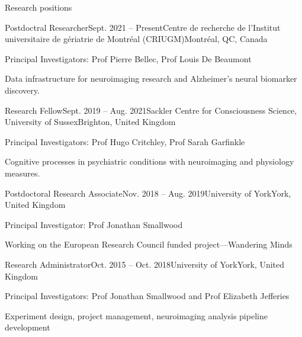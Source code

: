\documentclass{resume} %
\begin{document}
%



\begin{rSection}{Research positions}

  \begin{rSubsection}{Postdoctral Researcher}{Sept. 2021 -- Present}{Centre de recherche de l'Institut universitaire de g\'eriatrie de Montr\'eal (CRIUGM)}{Montr\'eal, QC, Canada}
    \item Principal Investigators: Prof Pierre Bellec, Prof Louis De Beaumont
    \item Data infrastructure for neuroimaging research and Alzheimer's neural biomarker discovery.
  \end{rSubsection}

  \begin{rSubsection}{Research Fellow}{Sept. 2019 -- Aug. 2021}{Sackler Centre for Consciousness Science, University of Sussex}{Brighton, United Kingdom}
    \item Principal Investigators: Prof Hugo Critchley, Prof Sarah Garfinkle
    \item Cognitive processes in psychiatric conditions with neuroimaging and physiology measures.
  \end{rSubsection}

  \begin{rSubsection}{Postdoctoral Research Associate}{Nov. 2018 -- Aug. 2019}{University of York}{York, United Kingdom}
  \item Principal Investigator: Prof Jonathan Smallwood
  \item Working on the European Research Council funded project---Wandering Minds
  \end{rSubsection}

  \begin{rSubsection}{Research Administrator}{Oct. 2015 -- Oct. 2018}{University of York}{York, United Kingdom}
    \item Principal Investigators: Prof Jonathan Smallwood and Prof Elizabeth Jefferies
    \item Experiment design, project management, neuroimaging analysis pipeline development
  \end{rSubsection}

  \end{rSection}
\end{document}
